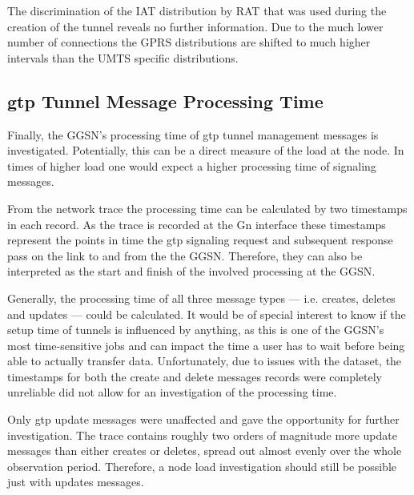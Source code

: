 The discrimination of the \gls{IAT} distribution by \gls{RAT} that was used during the creation of the tunnel reveals no further information. Due to the much lower number of connections the \gls{GPRS} distributions are shifted to much higher intervals than the \gls{UMTS} specific distributions.



\subsection{\texorpdfstring{\acrshort{gtp}}{GTP} Tunnel Message Processing Time}

Finally, the \gls{GGSN}'s processing time of \gls{gtp} tunnel management messages is investigated. Potentially, this can be a direct measure of the load at the node. In times of higher load one would expect a higher processing time of signaling messages.

From the network trace the processing time can be calculated by two timestamps in each record.
As the trace is recorded at the Gn interface these timestamps represent the points in time the \gls{gtp} signaling request and subsequent response pass on the link to and from the the \gls{GGSN}. Therefore, they can also be interpreted as the start and finish of the involved processing at the \gls{GGSN}.

Generally, the processing time of all three message types --- i.e. creates, deletes and updates --- could be calculated. It would be of special interest to know if the setup time of tunnels is influenced by anything, as this is one of the \gls{GGSN}'s most time-sensitive jobs and can impact the time a user has to wait before being able to actually transfer data. Unfortunately, due to issues with the dataset, the timestamps for both the create and delete messages records were completely unreliable did not allow for an investigation of the processing time. 

Only \gls{gtp} update messages were unaffected and gave the opportunity for further investigation.
The trace contains roughly two orders of magnitude more update messages than either creates or deletes, spread out almost evenly over the whole observation period. Therefore, a node load investigation should still be possible just with updates messages.

